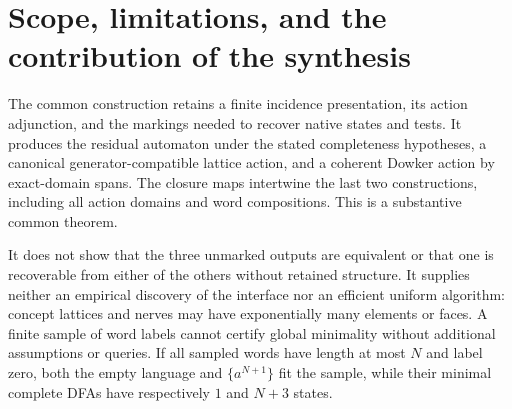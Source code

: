 \documentclass[11pt]{article}
\theoremstyle{remark}
\begin{document}
\section{Scope, limitations, and the contribution of the synthesis}

The common construction retains a finite incidence presentation, its
action adjunction, and the markings needed to recover native states and
tests. It produces the residual automaton under the stated completeness
hypotheses, a canonical generator-compatible lattice action, and a
coherent Dowker action by exact-domain spans. The closure maps intertwine
the last two constructions, including all action domains and word
compositions. This is a substantive common theorem.

It does not show that the three unmarked outputs are equivalent or that
one is recoverable from either of the others without retained structure.
It supplies neither an empirical discovery of the interface nor an
efficient uniform algorithm: concept lattices and nerves may have
exponentially many elements or faces. A finite sample of word labels
cannot certify global minimality without additional assumptions or
queries. If all sampled words have length at most $N$ and label zero,
both the empty language and $\{a^{N+1}\}$ fit the sample, while their
minimal complete DFAs have respectively $1$ and $N+3$ states.
\end{document}
